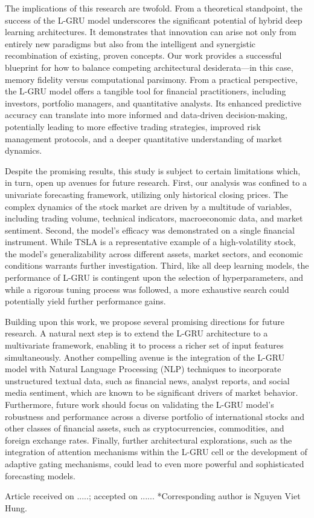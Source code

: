 \documentclass{cys}
\begin{document}
The implications of this research are twofold. From a theoretical standpoint, the success of the L-GRU model underscores the significant potential of hybrid deep learning architectures. It demonstrates that innovation can arise not only from entirely new paradigms but also from the intelligent and synergistic recombination of existing, proven concepts. Our work provides a successful blueprint for how to balance competing architectural desiderata—in this case, memory fidelity versus computational parsimony. From a practical perspective, the L-GRU model offers a tangible tool for financial practitioners, including investors, portfolio managers, and quantitative analysts. Its enhanced predictive accuracy can translate into more informed and data-driven decision-making, potentially leading to more effective trading strategies, improved risk management protocols, and a deeper quantitative understanding of market dynamics.

Despite the promising results, this study is subject to certain limitations which, in turn, open up avenues for future research. First, our analysis was confined to a univariate forecasting framework, utilizing only historical closing prices. The complex dynamics of the stock market are driven by a multitude of variables, including trading volume, technical indicators, macroeconomic data, and market sentiment. Second, the model's efficacy was demonstrated on a single financial instrument. While TSLA is a representative example of a high-volatility stock, the model's generalizability across different assets, market sectors, and economic conditions warrants further investigation. Third, like all deep learning models, the performance of L-GRU is contingent upon the selection of hyperparameters, and while a rigorous tuning process was followed, a more exhaustive search could potentially yield further performance gains.

Building upon this work, we propose several promising directions for future research. A natural next step is to extend the L-GRU architecture to a multivariate framework, enabling it to process a richer set of input features simultaneously. Another compelling avenue is the integration of the L-GRU model with Natural Language Processing (NLP) techniques to incorporate unstructured textual data, such as financial news, analyst reports, and social media sentiment, which are known to be significant drivers of market behavior. Furthermore, future work should focus on validating the L-GRU model's robustness and performance across a diverse portfolio of international stocks and other classes of financial assets, such as cryptocurrencies, commodities, and foreign exchange rates. Finally, further architectural explorations, such as the integration of attention mechanisms within the L-GRU cell or the development of adaptive gating mechanisms, could lead to even more powerful and sophisticated forecasting models.



\vspace{12pt}


Article received on .....; accepted on ...... 
*Corresponding author is Nguyen Viet Hung. 
\end{document}
